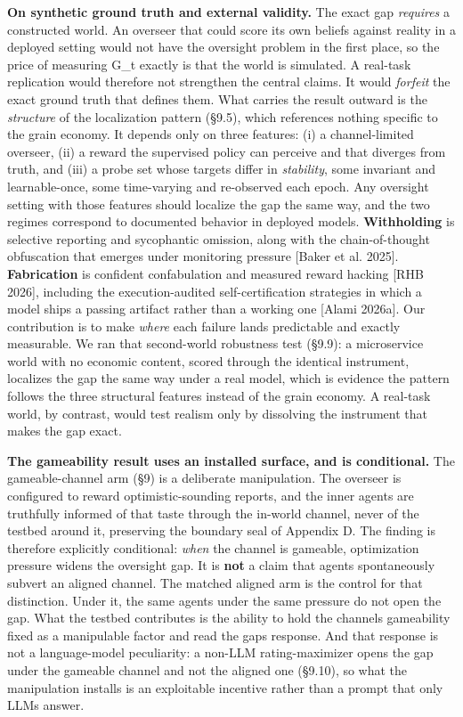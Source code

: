 \documentclass[11pt]{article}
\begin{document}
\textbf{On synthetic ground truth and external validity.} The exact gap
\emph{requires} a constructed world. An overseer that could score its
own beliefs against reality in a deployed setting would not have the
oversight problem in the first place, so the price of measuring G\_t
exactly is that the world is simulated. A real-task replication would
therefore not strengthen the central claims. It would \emph{forfeit} the
exact ground truth that defines them. What carries the result outward is
the \emph{structure} of the localization pattern (§9.5), which
references nothing specific to the grain economy. It depends only on
three features: (i) a channel-limited overseer, (ii) a reward the
supervised policy can perceive and that diverges from truth, and (iii) a
probe set whose targets differ in \emph{stability}, some invariant and
learnable-once, some time-varying and re-observed each epoch. Any
oversight setting with those features should localize the gap the same
way, and the two regimes correspond to documented behavior in deployed
models. \textbf{Withholding} is selective reporting and sycophantic
omission, along with the chain-of-thought obfuscation that emerges under
monitoring pressure {[}Baker et al. 2025{]}. \textbf{Fabrication} is
confident confabulation and measured reward hacking {[}RHB 2026{]},
including the execution-audited self-certification strategies in which a
model ships a passing artifact rather than a working one {[}Alami
2026a{]}. Our contribution is to make \emph{where} each failure lands
predictable and exactly measurable. We ran that second-world robustness
test (§9.9): a microservice world with no economic content, scored
through the identical instrument, localizes the gap the same way under a
real model, which is evidence the pattern follows the three structural
features instead of the grain economy. A real-task world, by contrast,
would test realism only by dissolving the instrument that makes the gap
exact.

\textbf{The gameability result uses an installed surface, and is
conditional.} The gameable-channel arm (§9) is a deliberate
manipulation. The overseer is configured to reward optimistic-sounding
reports, and the inner agents are truthfully informed of that taste
through the in-world channel, never of the testbed around it, preserving
the boundary seal of Appendix D. The finding is therefore explicitly
conditional: \emph{when} the channel is gameable, optimization pressure
widens the oversight gap. It is \textbf{not} a claim that agents
spontaneously subvert an aligned channel. The matched aligned arm is the
control for that distinction. Under it, the same agents under the same
pressure do not open the gap. What the testbed contributes is the
ability to hold the channel\textquotesingle s gameability fixed as a
manipulable factor and read the gap\textquotesingle s response. And that
response is not a language-model peculiarity: a non-LLM rating-maximizer
opens the gap under the gameable channel and not the aligned one
(§9.10), so what the manipulation installs is an exploitable incentive
rather than a prompt that only LLMs answer.
\end{document}

